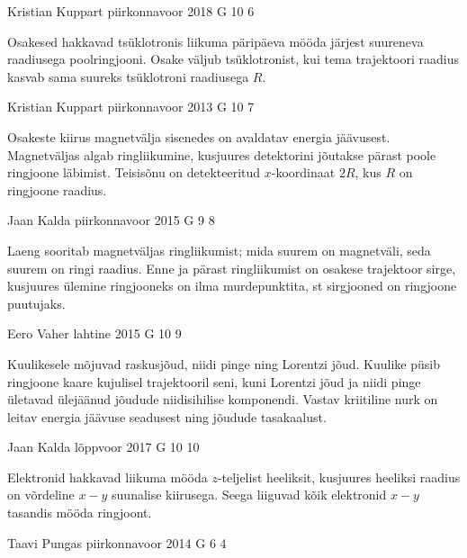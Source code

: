 \documentclass[11pt, twoside]{article}
\begin{document}
{%
{Kristian Kuppart} %
{piirkonnavoor} %
{2018} %
{G 10} %
{6} %
{

\ifHint
Osakesed hakkavad tsüklotronis liikuma päripäeva mööda järjest suureneva raadiusega poolringjooni. Osake väljub tsüklotronist, kui tema trajektoori raadius kasvab sama suureks tsüklotroni raadiusega $R$.
\fi
}

{Kristian Kuppart} %
{piirkonnavoor} %
{2013} %
{G 10} %
{7} %
{

\ifHint
Osakeste kiirus magnetvälja sisenedes on avaldatav energia jäävusest. Magnetväljas algab ringliikumine, kusjuures detektorini jõutakse pärast poole ringjoone läbimist. Teisisõnu on detekteeritud $x$-koordinaat $2R$, kus $R$ on ringjoone raadius.
\fi
}

{Jaan Kalda} %
{piirkonnavoor} %
{2015} %
{G 9} %
{8} %
{

\ifHint
Laeng sooritab magnetväljas ringliikumist; mida suurem on magnetväli, seda suurem on ringi raadius. Enne ja pärast ringliikumist on osakese trajektoor sirge, kusjuures ülemine ringjooneks on ilma murdepunktita, st sirgjooned on ringjoone puutujaks.
\fi
}

{Eero Vaher} %
{lahtine} %
{2015} %
{G 10} %
{9} %
{

\ifHint
Kuulikesele mõjuvad raskusjõud, niidi pinge ning Lorentzi jõud. Kuulike püsib ringjoone kaare kujulisel trajektooril seni, kuni Lorentzi jõud ja niidi pinge ületavad ülejäänud jõudude niidisihilise komponendi. Vastav kriitiline nurk on leitav energia jäävuse seadusest ning jõudude tasakaalust.
\fi
}

{Jaan Kalda} %
{lõppvoor} %
{2017} %
{G 10} %
{10} %
{

\ifHint
Elektronid hakkavad liikuma mööda $z$-teljelist heeliksit, kusjuures heeliksi raadius on võrdeline $x-y$ suunalise kiirusega. Seega liiguvad kõik elektronid $x-y$ tasandis mööda ringjoont.
\fi
}

{Taavi Pungas} %
{piirkonnavoor} %
{2014} %
{G 6} %
{4} %
{

}}
\end{document}
